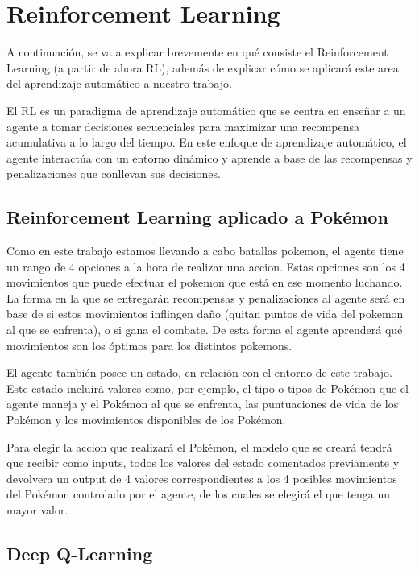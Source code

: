 \chapter{Reinforcement Learning}

A continuación, se va a explicar brevemente en qué consiste el Reinforcement Learning (a partir de ahora RL), además de explicar cómo se aplicará este area del aprendizaje automático a nuestro trabajo.

El RL es un paradigma de aprendizaje automático que se centra en enseñar a un agente a tomar decisiones secuenciales para maximizar una recompensa acumulativa a lo largo del tiempo. En este enfoque de aprendizaje automático, el agente interactúa con un entorno dinámico y aprende a base de las recompensas y penalizaciones que conllevan sus decisiones.

\section{Reinforcement Learning aplicado a Pokémon}

Como en este trabajo estamos llevando a cabo batallas pokemon, el agente tiene un rango de 4 opciones a la hora de realizar una accion. Estas opciones son los 4 movimientos que puede efectuar el pokemon que está en ese momento luchando. La forma en la que se entregarán recompensas y penalizaciones al agente será en base de si estos movimientos inflingen daño (quitan puntos de vida del pokemon al que se enfrenta), o si gana el combate. De esta forma el agente aprenderá qué movimientos son los óptimos para los distintos pokemons.

El agente también posee un estado, en relación con el entorno de este trabajo. Este estado incluirá valores como, por ejemplo, el tipo o tipos de Pokémon que el agente maneja y el Pokémon al que se enfrenta, las puntuaciones de vida de los Pokémon y los movimientos disponibles de los Pokémon.

Para elegir la accion que realizará el Pokémon, el modelo que se creará tendrá que recibir como inputs, todos los valores del estado comentados previamente y devolvera un output de 4 valores correspondientes a los 4 posibles movimientos del Pokémon controlado por el agente, de los cuales se elegirá el que tenga un mayor valor.

\section{Deep Q-Learning}

